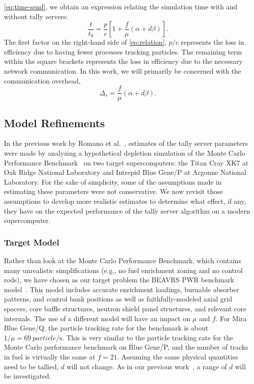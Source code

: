 \documentclass{snamc2013}
\begin{document}
\autoref{eq:time-send}, we obtain an expression relating the simulation time with
and without tally servers:
\begin{equation}
  \label{eq:relation}
  \frac{t}{t_0} = \frac{p}{c} \left [ 1 + \frac{f}{\mu} \left ( \alpha + d\beta
  \right ) \right ].
\end{equation}
The first factor on the right-hand side of \autoref{eq:relation}, $p/c$
represents the loss in efficiency due to having fewer processes tracking
particles. The remaining term within the square brackets represents the loss in
efficiency due to the necessary network communication. In this work, we will
primarily be concerned with the communication overhead,
\begin{equation}
  \label{eq:overhead}
  \Delta_s = \frac{f}{\mu} \left ( \alpha + d\beta \right ).
\end{equation}

\subsection{Model Refinements}

In the previous work by Romano et al.~\cite{jcp-romano-2013}, estimates of the
tally server parameters were made by analyzing a hypothetical depletion
simulation of the Monte Carlo Performance Benchmark~\cite{mc-hoogenboom-2011} on
two target supercomputers: the Titan Cray XK7 at Oak Ridge National Laboratory
and Intrepid Blue Gene/P at Argonne National Laboratory. For the sake of
simplicity, some of the assumptions made in estimating these parameters were not
conservative. We now revisit those assumptions to develop more realistic
estimates to determine what effect, if any, they have on the expected
performance of the tally server algorithm on a modern supercomputer.

\subsubsection{Target Model}

Rather than look at the Monte Carlo Performance Benchmark, which contains many
unrealistic simplifications (e.g., no fuel enrichment zoning and no control
rods), we have chosen as our target problem the BEAVRS PWR benchmark
model~\cite{mc-horelik-2013}. This model includes accurate enrichment loadings,
burnable absorber patterns, and control bank positions as well as
faithfully-modeled axial grid spacers, core baffle structures, neutron shield
panel structures, and relevant core internals. The use of a different model will
have an impact on $\mu$ and $f$. For Mira Blue Gene/Q, the particle tracking
rate for the benchmark is about $1/\mu = \SI{69}{particle/\second}$. This is
very similar to the particle tracking rate for the Monte Carlo performance
benchmark on Blue Gene/P, and the number of tracks in fuel is virtually the same
at $f = 21$. Assuming the same physical quantities need to be tallied, $d$ will
not change. As in our previous work~\cite{jcp-romano-2013}, a range of $d$ will
be investigated.
\end{document}

